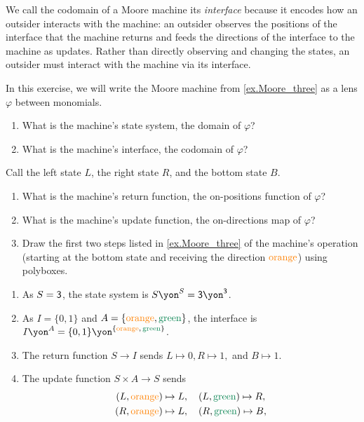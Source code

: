 \documentclass[Book-Poly]{subfiles}
\begin{document}
We call the codomain of a Moore machine its \emph{interface} because it encodes how an outsider interacts with the machine: an outsider observes the positions of the interface that the machine returns and feeds the directions of the interface to the machine as updates.
Rather than directly observing and changing the states, an outsider must interact with the machine via its interface.

\begin{exercise}
In this exercise, we will write the Moore machine from \cref{ex.Moore_three} as a lens $\varphi$ between monomials.
\begin{enumerate}
    \item What is the machine's state system, the domain of $\varphi$?
    \item What is the machine's interface, the codomain of $\varphi$?
\end{enumerate}
Call the left state $L$, the right state $R$, and the bottom state $B$.
\begin{enumerate}[resume]
    \item What is the machine's return function, the on-positions function of $\varphi$?
    \item What is the machine's update function, the on-directions map of $\varphi$?
    \item Draw the first two steps listed in \cref{ex.Moore_three} of the machine's operation (starting at the bottom state and receiving the direction ${\color{orange}\text{orange}}$) using polyboxes.
    \qedhere
\end{enumerate}
\begin{solution}
\begin{enumerate}
    \item As $S=\textsf{3}$, the state system is $S\yon^S=\3\yon^\3$.
    \item As $I=\{0,1\}$ and $A=\{{\color{orange}\text{orange}},{\color{dgreen}\text{green}}\}$, the interface is $I\yon^A=\{0,1\}\yon^{\{{\color{orange}\text{orange}},\,{\color{dgreen}\text{green}}\}}$.
    \item The return function $S\to I$ sends $L\mapsto 0, R\mapsto 1,$ and $B\mapsto 1$.
    \item The update function $S\times A\to S$ sends
    \begin{align*}
        (L, {\color{orange}\text{orange}})\mapsto L&,\quad(L, {\color{dgreen}\text{green}})\mapsto R, \\
        (R, {\color{orange}\text{orange}})\mapsto L&,\quad(R, {\color{dgreen}\text{green}})\mapsto B, \\

\end{align*}
\end{enumerate}
\end{solution}
\end{exercise}
\end{document}
